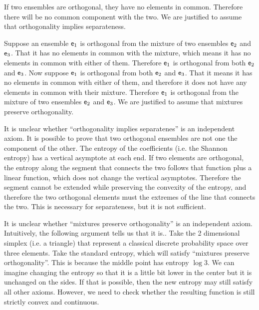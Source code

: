 \begin{justification}
	If two ensembles are orthogonal, they have no elements in common. Therefore there will be no common component with the two. We are justified to assume that orthogonality implies separateness.
	
	Suppose an ensemble $\mathsf{e}_1$ is orthogonal from the mixture of two ensembles $\mathsf{e}_2$ and $\mathsf{e}_3$. That it has no elements in common with the mixture, which means it has no elements in common with either of them. Therefore $\mathsf{e}_1$ is orthogonal from both $\mathsf{e}_2$ and $\mathsf{e}_3$. Now suppose $\mathsf{e}_1$ is orthogonal from both $\mathsf{e}_2$ and $\mathsf{e}_3$. That it means it has no elements in common with either of them, and therefore it does not have any elements in common with their mixture. Therefore $\mathsf{e}_1$ is orthogonal from the mixture of two ensembles $\mathsf{e}_2$ and $\mathsf{e}_3$. We are justified to assume that mixtures preserve orthogonality.
\end{justification}

\begin{remark}
	It is unclear whether ``orthogonality implies separatenes'' is an independent axiom. It is possible to prove that two orthogonal ensembles are not one the component of the other. The entropy of the coefficients (i.e. the Shannon entropy) has a vertical asymptote at each end. If two elements are orthogonal, the entropy along the segment that connects the two follows that function plus a linear function, which does not change the vertical asymptotes. Therefore the segment cannot be extended while preserving the convexity of the entropy, and therefore the two orthogonal elements must the extremes of the line that connects the two. This is necessary for separateness, but it is not sufficient.
\end{remark}

\begin{remark}
	It is unclear whether ``mixtures preserve orthogonality'' is an independent axiom. Intuitively, the following argument tells us that it is.. Take the 2 dimensional simplex (i.e. a triangle) that represent a classical discrete probability space over three elements. Take the standard entropy, which will satisfy ``mixtures preserve orthogonality''. This is because the middle point has entropy $\log 3$. We can imagine changing the entropy so that it is a little bit lower in the center but it is unchanged on the sides. If that is possible, then the new entropy may still satisfy all other axioms. However, we need to check whether the resulting function is still strictly convex and continuous.
\end{remark}


